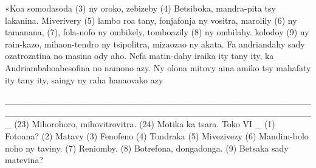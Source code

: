 «Koa somodasoda (3) ny oroko, zebizeby (4) Betsiboka, mandra-pita
tsy lakanina. Miverivery (5) lambo roa tany, fonjafonja ny vositra, marolily
(6) ny tamanana, (7), fola-nofo ny ombikely, tomboazily (8) ny ombilahy.
kolodoy (9) ny rain-kazo, mihaon-tendro ny tsipolitra, mizaozao ny akata.
Fa andriandahy sady ozatrozatina no masina ody aho. Nefa matin-dahy
iraika ity tany ity, ka Andriambahoabesofina no namono azy. Ny olona
mitovy aina amiko tsy mahafaty ity tany ity, saingy ny raha hanaovako azy

_________________________________________________________________________________________________
(23) Mihorohoro, mihovitrovitra. 
(24) Motika ka tsara.
Toko VI _ (1) Fotoana?
(2) Matavy
(3) Fenofeno 
(4) Tondraka
(5) Mivezivezy
(6) Mandim-bolo noho ny taviny. 
(7) Reniomby. 
(8) Botrefona, dongadonga. 
(9) Betsaka sady matevina?